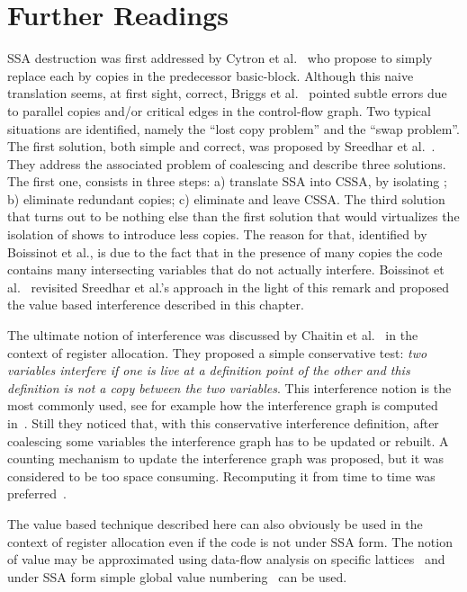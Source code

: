  \section{Further Readings}
SSA destruction was first addressed by Cytron et al.~\cite{CFR+91} who propose to simply replace each \phifun by copies in the predecessor basic-block. Although this naive translation seems, at first sight, correct, Briggs et
al.~\cite{BriggsSSA} pointed subtle errors due to parallel copies and/or
critical edges in the control-flow graph. Two typical situations are
identified, namely the ``lost copy problem'' and the ``swap problem''.
The first solution, both simple and correct, was proposed by Sreedhar et al.~\cite{VC+99}. They address the associated problem of coalescing and describe three solutions. 
The first one, consists in three
steps: a) translate SSA into CSSA, by isolating \phifuns; b)
eliminate redundant copies; c) eliminate \phifuns and leave CSSA.
The third solution that turns out to be nothing else than the first solution that would virtualizes the isolation of \phifuns shows to introduce less copies. The reason for that, identified by Boissinot et al., is due to the fact that in the presence of many copies the code contains many intersecting variables that do not actually interfere. Boissinot et al.~\cite{Boissinot09} revisited Sreedhar et al.'s approach in the light of this remark and proposed the value based interference described in this chapter.

The ultimate notion of interference was discussed by Chaitin et al.~\cite{Chaitin81} in the context of register allocation. 
They proposed a simple conservative test: \emph{two variables interfere if
  one is live at a definition point of the other and this definition is not a
  copy between the two variables}. This interference notion is the most
commonly used, see for example how the interference graph is computed
in~\cite{appel:2002:modern}. Still they noticed that, with this conservative interference definition,
after coalescing some variables the interference graph has to be updated or rebuilt. 
A counting mechanism to update the interference graph was proposed,  but it was considered to be
too space consuming. Recomputing it from time to time was preferred~\cite{Chaitin81,Chaitin82}.

The value based technique described here can also obviously be used in the context of register allocation even if the code is not under SSA form. The notion of value may be approximated using data-flow analysis on specific lattices~\cite{AlpernWZ88} and under SSA form simple global value numbering~\cite{Rosen88} can be used.

